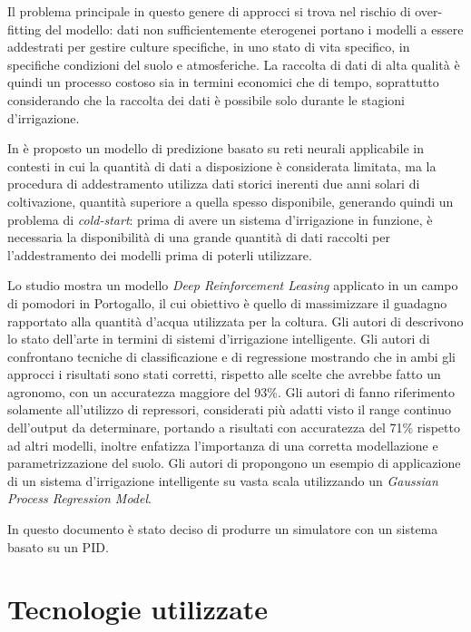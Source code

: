 \documentclass[12pt,a4paper,openright,twoside, openany]{book}
\begin{document}
Il problema principale in questo genere di approcci si trova nel rischio di over-fitting del modello: dati non sufficientemente eterogenei portano i modelli a essere addestrati per gestire culture specifiche, in uno stato di vita specifico, in specifiche condizioni del suolo e atmosferiche.
La raccolta di dati di alta qualità è quindi un processo costoso sia in termini economici che di tempo, soprattutto considerando che la raccolta dei dati è possibile solo durante le stagioni d'irrigazione.

In \cite{Gonzalez2019} è proposto un modello di predizione basato su reti neurali applicabile in contesti in cui la quantità di dati a disposizione è considerata limitata, ma la procedura di addestramento utilizza dati storici inerenti due anni solari di coltivazione, quantità superiore a quella spesso disponibile, generando quindi un problema di \textit{cold-start}: prima di avere un sistema d'irrigazione in funzione, è necessaria la disponibilità di una grande quantità di dati raccolti per l'addestramento dei modelli prima di poterli utilizzare.

Lo studio \cite{Alibaei2022} mostra un modello \textit{Deep Reinforcement Leasing} applicato in un campo di pomodori in Portogallo, il cui obiettivo è quello di massimizzare il guadagno rapportato alla quantità d'acqua utilizzata per la coltura.  Gli autori di \cite{García2020, Emmanuel2022} descrivono lo stato dell'arte in termini di sistemi d'irrigazione intelligente.
Gli autori di \cite{Goldstein2017} confrontano tecniche di classificazione e di regressione mostrando che in ambi gli approcci i risultati sono stati corretti, rispetto alle scelte che avrebbe fatto un agronomo, con un accuratezza maggiore del 93\%. Gli autori di \cite{Sidhu2020} fanno riferimento solamente all'utilizzo di repressori, considerati più adatti visto il range continuo dell'output da determinare, portando a risultati con accuratezza del 71\% rispetto ad altri modelli, inoltre enfatizza l'importanza di una corretta modellazione e parametrizzazione del suolo. Gli autori di \cite{Emami2022} propongono un esempio di applicazione di un sistema d'irrigazione intelligente su vasta scala utilizzando un \textit{Gaussian Process Regression Model}.

In questo documento è stato deciso di produrre un simulatore con un sistema basato su un \ac{PID}.
\newpage
\chapter{Tecnologie utilizzate}
\end{document}

